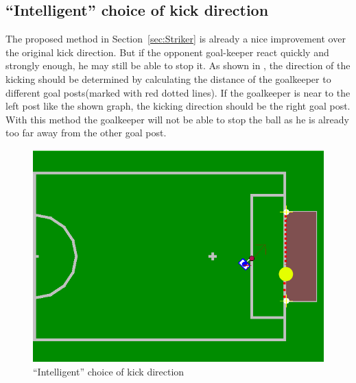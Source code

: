 \subsection{``Intelligent'' choice of kick direction}
The proposed method in Section~\ref{sec:Striker} is already a nice improvement over the original kick direction. But if the opponent goal-keeper react quickly and strongly enough, he may still be able to stop it. As shown in , the direction of the kicking should be determined by calculating the distance of the goalkeeper to different goal posts(marked with red dotted lines). If the goalkeeper is near to the left post like the shown graph, the kicking direction should be the right goal post. With this method the goalkeeper will not be able to stop the ball as he is already too far away from the other goal post.
\begin{figure}[!htb]
    \includegraphics[scale = 0.3]{pics/striker_future}
    \centering
    \caption{``Intelligent'' choice of kick direction}
    \label{fig:IntKik}
\end{figure}
